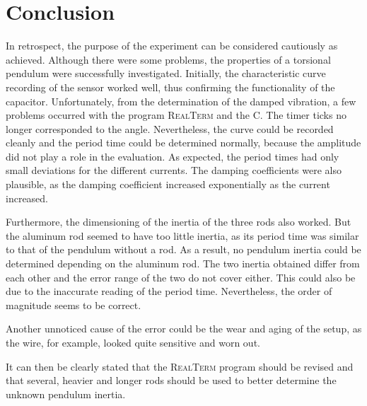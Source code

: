 \chapter{Conclusion}
%
In retrospect, the purpose of the experiment can be considered cautiously as achieved. Although there were some problems,
the properties of a torsional pendulum were successfully investigated.
Initially, the characteristic curve recording of the sensor worked well, thus confirming the functionality of the capacitor.
Unfortunately, from the determination of the damped vibration, a few problems occurred with the program \textsc{RealTerm} and the
\micro C. The  timer  ticks no longer corresponded to the angle. Nevertheless, the curve could be recorded cleanly
and the period time could be determined normally, because the amplitude did not play a role in the evaluation. As expected,
the period times had only small deviations for the different currents. The damping coefficients were also plausible, as
the damping coefficient increased exponentially as the current increased.\par
Furthermore, the dimensioning of the inertia of the three rods also worked. But the aluminum rod seemed to have too little
inertia, as its period time was similar to that of the pendulum without a rod. As a result, no pendulum inertia could be
determined depending on the aluminum rod. The two inertia obtained differ from each other and the error range of the two
do not cover either. This could also be due to the inaccurate reading of the period time. Nevertheless, the order of
magnitude seems to be correct.\par
Another unnoticed cause of the error could be the wear and aging of the setup, as the wire, for example, looked quite
sensitive and worn out.\par
It can then be clearly stated that the \textsc{RealTerm} program should be revised and that several, heavier and longer rods should
be used to better determine the unknown pendulum inertia.